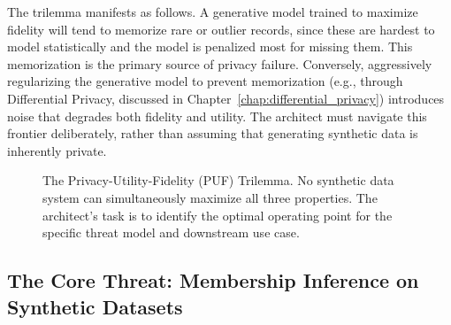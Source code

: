 The trilemma manifests as follows.
A generative model trained to maximize fidelity will tend to memorize
rare or outlier records, since these are hardest to model
statistically and the model is penalized most for missing them.
This memorization is the primary source of privacy failure.
Conversely, aggressively regularizing the generative model to prevent
memorization (e.g., through Differential Privacy, discussed in
Chapter~\ref{chap:differential_privacy}) introduces noise that degrades both fidelity
and utility.
The architect must navigate this frontier deliberately, rather than
assuming that generating synthetic data is inherently private.

\begin{figure}[ht]
\centering
{}
\caption{The Privacy-Utility-Fidelity (PUF) Trilemma.
  No synthetic data system can simultaneously maximize all three
  properties.
  The architect's task is to identify the optimal operating point for
  the specific threat model and downstream use case.}
\label{fig:puf-trilemma}
\end{figure}

\subsection{The Core Threat: Membership Inference on Synthetic
            Datasets}
\label{subsec:mia-synthetic}

